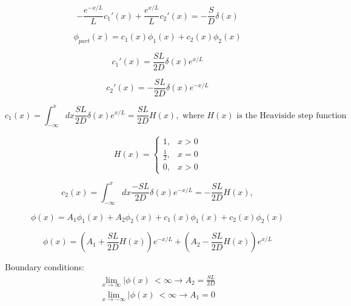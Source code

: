 \documentclass[12pt]{article}
\begin{document}
\begin{equation*}
-\frac{e^{-x/L}}{L}c_1'(x) + \frac{e^{x/L}}{L}c_2'(x) = -\frac{S}{D}\delta(x)
\end{equation*}

\begin{equation*}
\phi_{part}(x) = c_1(x)\phi_1(x) + c_2(x)\phi_2(x)
\end{equation*}

\begin{equation*}
c_1'(x) = \frac{SL}{2D}\delta(x)e^{x/L}
\end{equation*}

\begin{equation*}
c_2'(x) = -\frac{SL}{2D}\delta(x)e^{-x/L}
\end{equation*}

\begin{equation*}
c_1(x) = \int_{-\infty}^x dx\frac{SL}{2D}\delta(x)e^{x/L} = \frac{SL}{2D}H(x),
\text{ where $H(x)$ is the Heaviside step function}
\end{equation*}

\begin{equation*}
  H(x)=\begin{cases}
    1, & x > 0 \\
    \tfrac{1}{2}, & x = 0 \\
    0, & x > 0
  \end{cases}
\end{equation*}

\begin{equation*}
c_2(x) = \int_{-\infty}^x dx\frac{-SL}{2D}\delta(x)e^{-x/L} = -\frac{SL}{2D}H(x),
\end{equation*}

\begin{equation*}
\phi(x) = A_1\phi_1(x) + A_2\phi_2(x) + c_1(x)\phi_1(x) + c_2(x)\phi_2(x)
\end{equation*}

\begin{equation*}
\phi(x) = \left(A_1 + \frac{SL}{2D}H(x)\right)e^{-x/L} + \left(A_2 - \frac{SL}{2D}H(x)\right)e^{x/L}
\end{equation*}

Boundary conditions:
\vspace{-5 mm}
\begin{gather*}
\lim\limits_{x\to\infty}|\phi(x)\ < \infty \rightarrow A_2 = \frac{SL}{2D} \\
\lim\limits_{x\to-\infty}|\phi(x)\ < \infty \rightarrow A_1 = 0
\end{gather*}
\end{document}
